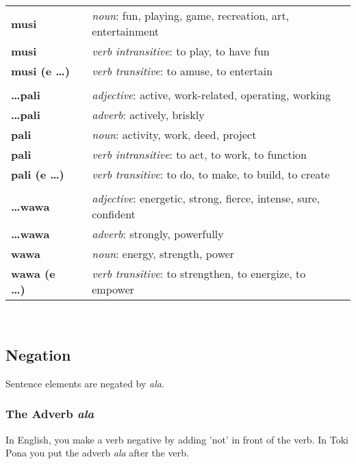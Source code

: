 \begin{supertabular}{p{2,5cm}|ll}
\textbf{musi} && \textit{noun}: fun, playing, game, recreation, art, entertainment \\ %
\textbf{musi} && \textit{verb intransitive}: to play, to have fun \\ %
\textbf{musi (e \dots)} && \textit{verb transitive}: to amuse, to entertain \\ %
 && \\ %
%
\textbf{\dots pali} && \textit{adjective}: active, work-related, operating, working \\ %
\textbf{\dots pali} && \textit{adverb}: actively, briskly \\ %
\textbf{pali} && \textit{noun}: activity, work, deed, project \\ %
\textbf{pali} && \textit{verb intransitive}: to act, to work, to function \\ %
\textbf{pali (e \dots)} && \textit{verb transitive}: to do, to make, to build, to create \\ %
 && \\ %
%
\textbf{\dots wawa} && \textit{adjective}: energetic, strong, fierce, intense, sure, confident \\ %
\textbf{\dots wawa} && \textit{adverb}: strongly, powerfully \\ %
\textbf{wawa} && \textit{noun}: energy, strength, power \\ %
\textbf{wawa (e \dots)} && \textit{verb transitive}: to strengthen, to energize, to empower \\ %
\end{supertabular} \\
%
\newpage
%
\subsection*{Negation}
%
%

Sentence elements are negated by \textit{ala}.

\subsubsection*{The Adverb \textit{ala}}
%
%
In English, you make a verb negative by adding 'not' in front of the verb.
In Toki Pona you put the adverb \textit{ala} after the verb. 


